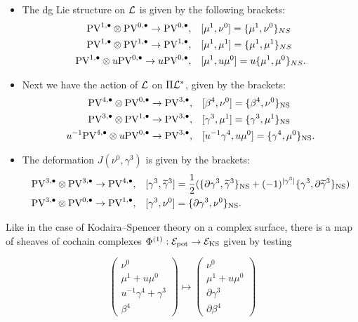 \documentclass[11pt]{amsart}
\def\PV{{\rm PV}}
\begin{document}
\begin{itemize}
\item The dg Lie structure on $\mathcal L$ is given by the following brackets:
\begin{align*}
  \PV^{1,\bu}\otimes\PV^{0,\bu}\to \PV^{0,\bu},\ \ \ & [\mu^{1},\nu^{0}] = \{\mu^{1},\nu^{0}\}_{NS}  \\
  \PV^{1,\bu}\otimes\PV^{1,\bu}\to\PV^{1,\bu},\ \ \ & [\mu^{1}, \mu^{1}] = \{\mu^{1}, \mu^{1}\}_{NS} \\
  \PV^{1,\bu}\otimes u\PV^{0,\bu}\to u\PV^{0,\bu}, \ \ \ & [\mu^{1}, u\mu^{0}]=u\{\mu^{1},\mu^{0}\}_{NS}.
\end{align*}

\item Next we have the action of $\mathcal L$ on $\Pi\mathcal L^{*}$, given by the brackets:
\begin{align}
  \PV^{4,\bu}\otimes \PV^{0,\bu}\to \PV^{3,\bu}, \ \ \ & [\beta^{4}, \nu^{0}] = \{\beta^{4}, \nu^{0}\}_{\rm {NS}} \nonumber\\
  \PV^{3,\bu}\otimes \PV^{1,\bu}\to \PV^{3,\bu}, \ \ \ & [\gamma^{3}, \mu^{1}] = \{\gamma^{3}, \mu^{1}\}_{\rm NS} \label{funnybracket}\\
  u^{-1}\PV^{4,\bu}\otimes u\PV^{0,\bu}\to \PV^{3,\bu}, \ \ \ & [u^{-1}\gamma^{4}, u\mu^{0}] = \{\gamma^{4},\mu^{0}\}_{\rm NS}\label{funnybracketdesc}.
\end{align}

\item The deformation $J(\nu^{0},\gamma^{3})$ is given by the brackets:
\begin{align*}
  \PV^{3,\bu}\otimes \PV^{3,\bu}\to \PV^{4,\bu}, \ \ \ & [\gamma^3, \Tilde{\gamma}^3] = \frac{1}{2}(\{\partial \gamma^3 , \Tilde{\gamma}^{3}\}_{\rm NS} +(-1)^{|\gamma^{3}|} \{\gamma^3, \partial \Tilde{\gamma}^{3}\}_{\rm NS}) \\
\PV^{3,\bu}\otimes \PV^{0,\bu}\to \PV^{1,\bu}, \ \ \ & [\gamma^{3}, \nu^{0}] = \{\partial\gamma^{3}, \nu^{0}\}_{\rm NS}.
\end{align*}
\end{itemize}

Like in the case of Kodaira--Spencer theory on a complex surface, there is a  map of sheaves of cochain complexes $\Phi^{(1)}: \mathcal E_{\rm pot}\to \mathcal E_{\rm KS}$ given by testing

\[\begin{pmatrix}\nu^{0} \\ \mu^{1}+u\mu^{0} \\ u^{-1}\gamma^{4}+\gamma^{3} \\ \beta^{4}\end{pmatrix}\mapsto \begin{pmatrix}\nu^{0} \\ \mu^{1}+u\mu^{0} \\ \partial\gamma^{3} \\ \partial\beta^{4}\end{pmatrix}\]
\end{document}
